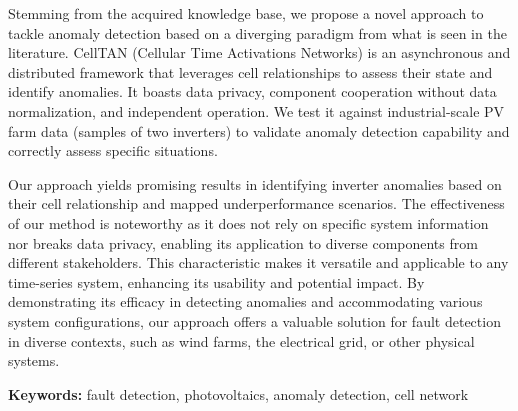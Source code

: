 Stemming from the acquired knowledge base, we propose a novel approach to tackle anomaly detection based on a diverging paradigm from what is seen in the literature. CellTAN (Cellular Time Activations Networks) is an asynchronous and distributed framework that leverages cell relationships to assess their state and identify anomalies. It boasts data privacy, component cooperation without data normalization, and independent operation.
We test it against industrial-scale PV farm data (samples of two inverters) to validate anomaly detection capability and correctly assess specific situations.

Our approach yields promising results in identifying inverter anomalies based on their cell relationship and mapped underperformance scenarios. The effectiveness of our method is noteworthy as it does not rely on specific system information nor breaks data privacy, enabling its application to diverse components from different stakeholders. This characteristic makes it versatile and applicable to any time-series system, enhancing its usability and potential impact. By demonstrating its efficacy in detecting anomalies and accommodating various system configurations, our approach offers a valuable solution for fault detection in diverse contexts, such as wind farms, the electrical grid, or other physical systems.


\smallskip

\textbf{Keywords:} fault detection, photovoltaics, anomaly detection, cell network